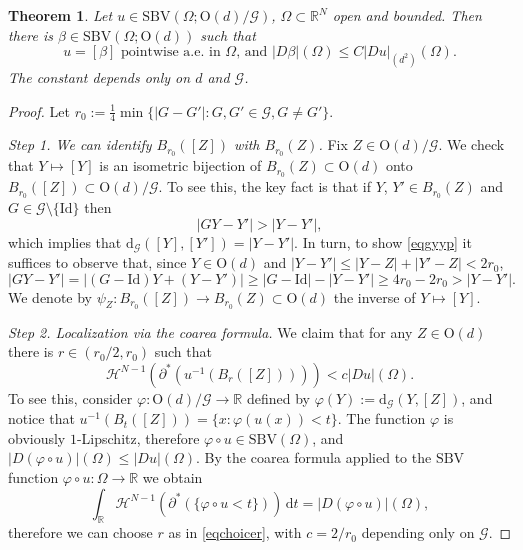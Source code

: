 \documentclass[a4paper,reqno]{amsart}
\newcommand\R{\mathbb{R}}
\newcommand{\SBV}{\mathrm{SBV}}
\newcommand{\dG}{\mathrm{d}_{\G}}
\newcommand\calH{\mathcal{H}}
\newcommand\Id{{\mathrm{Id}}}
\newcommand\dt{{\,\mathrm{d}t}}
\newtheorem{theorem}[definition]{Theorem}
\theoremstyle{remark}
\newcommand{\G}{\mathcal{G}}
\newcommand{\On}{\mathrm{O}(d)}
\newcommand{\OnG}{{\On}/{\G}}
\numberwithin{equation}{section}
\begin{document}
\begin{theorem}\label{theoliftingmanifold}
 Let $u\in \SBV(\Omega;\OnG)$, $\Omega\subset\R^N$ open and bounded. Then there is $\beta\in \SBV(\Omega;\On)$ such that
 \begin{equation}
 u=[\beta] \text{ pointwise a.e. in $\Omega$,  and } |D\beta|(\Omega)\le C |Du|_{(d^2)}(\Omega).
  \end{equation}
The constant depends only on $d$ and $\G$.
\end{theorem}
\begin{proof}
 Let $r_0:=\frac14 \min\{|G-G'|: G, G'\in\G, G\ne G'\}$.

 \emph{Step 1. We can identify $B_{r_0}([Z])$ with
 $B_{r_0}(Z)$.}
Fix $Z\in \OnG$. We check that $Y\mapsto [Y]$ is an isometric bijection of
$B_{r_0}(Z)\subset\On$ onto $B_{r_0}([Z])\subset\OnG$.
To see this, the key fact is that if $Y$, $Y'\in B_{r_0}(Z)$ and
$G\in \G\setminus\{\Id\}$ then
\begin{equation}\label{eqgyyp}
 |GY-Y'|> |Y-Y'|,
\end{equation}
which implies that $\dG([Y],[Y'])=|Y-Y'|$.
In turn, to show \eqref{eqgyyp} it suffices to observe that, since $Y\in\On$
and $|Y-Y'|\le |Y-Z|+|Y'-Z|<2r_0$,
\begin{equation}
 |GY-Y'|=|(G-\Id)Y+(Y-Y')|\ge |G-\Id|-|Y-Y'|
\ge 4r_0-2r_0>|Y-Y'|.
\end{equation}
We denote by  $\psi_Z:B_{r_0}([Z])\to B_{r_0}(Z)\subset\On$ the inverse of $Y\mapsto [Y]$.

\emph{Step 2. Localization via the coarea formula.}
  We claim that for any $Z\in \On$ there is $r\in (r_0/2,r_0)$ such that
 \begin{equation}\label{eqchoicer}
  \calH^{N-1}(\partial^*(u^{-1}(B_r([Z]))))<  c |Du|(\Omega).
 \end{equation}
To see this, consider $\varphi:\OnG\to\R$ defined by
$\varphi(Y):=\dG(Y,[Z])$, and
notice that $u^{-1}(B_t([Z]))=\{x: \varphi(u(x))<t\}$.
The function $\varphi$ is obviously $1$-Lipschitz, therefore $\varphi\circ u \in \SBV (\Omega)$, and 
$|D(\varphi\circ u)|(\Omega)\le |Du|(\Omega)$. By the coarea formula applied to the $\SBV$  function $\varphi\circ u: \Omega\to\R$ we obtain
\begin{equation}
 \int_\R  \calH^{N-1}(\partial^*(\{\varphi\circ u<t\})) \dt
 = |D(\varphi\circ u)|(\Omega),
\end{equation}
therefore we can choose $r$ as in \eqref{eqchoicer}, with $c=2/r_0$ depending only on $\G$.


\end{proof}
\end{document}
